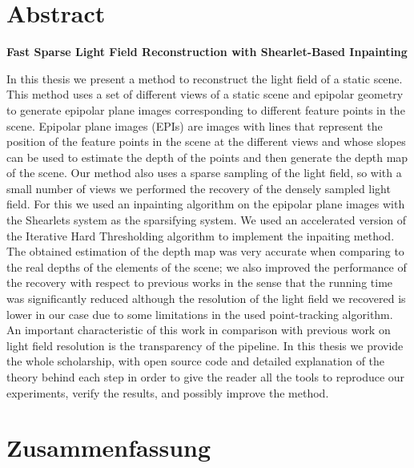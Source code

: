\documentclass[11pt, english, singlespacing, headsepline, ]{MastersDoctoralThesis}
\theoremstyle{definition}
\begin{document}
 

\clearpage\pagestyle{empty}
\section*{Abstract}

\begin{center}
\textbf{Fast Sparse Light Field Reconstruction with Shearlet-Based Inpainting}
\end{center}

In this thesis we present a method to reconstruct the light field of a static scene. This method uses a set of different views of a static scene and epipolar geometry to generate epipolar plane images corresponding to different feature points in the scene. Epipolar plane images (EPIs) are images with lines that represent the position of the feature points in the scene at the different views and whose slopes can be used to estimate the depth of the points and then generate the depth map of the scene. Our method also uses a sparse sampling of the light field, so with a small number of views we performed the recovery of the densely sampled light field. For this we used an inpainting algorithm on the epipolar plane images with the Shearlets system as the sparsifying system. We used an accelerated version of the Iterative Hard Thresholding algorithm to implement the inpaiting method. The obtained estimation of the depth map was very accurate when comparing to the real depths of the elements of the scene; we also improved the performance of the recovery with respect to previous works in the sense that the running time was significantly reduced although the resolution of the light field we recovered is lower in our case due to some limitations in the used point-tracking algorithm. An important characteristic of this work in comparison with previous work on light field resolution is the transparency of the pipeline. In this thesis we provide the whole scholarship, with open source code and detailed explanation of the theory behind each step in order to give the reader all the tools to reproduce our experiments, verify the results, and possibly improve the method.  

\clearpage\pagestyle{empty}
\section*{Zusammenfassung}
\end{document}
